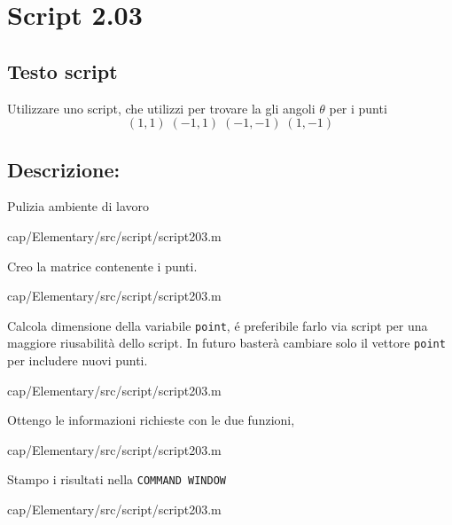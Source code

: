 \section{Script 2.03}\label{scr:script203}

\subsection{Testo script}
Utilizzare uno script, che utilizzi  
per trovare la  gli angoli $\theta$ per i punti  
$$(1,1)\;(-1,1)\;(-1,-1)\;(1,-1)$$

\subsection{Descrizione:}
Pulizia ambiente di lavoro

{cap/Elementary/src/script/script203.m}
\vspace{0.5em}

Creo la matrice contenente i punti.

{cap/Elementary/src/script/script203.m}
\vspace{1em}

Calcola dimensione della variabile \verb|point|, é preferibile farlo via script 
per una maggiore riusabilità dello script. In futuro basterà cambiare solo il 
vettore \verb|point| per includere nuovi punti.

{cap/Elementary/src/script/script203.m}
\vspace{1em}

Ottengo le informazioni richieste con le due funzioni, 

{cap/Elementary/src/script/script203.m}
\vspace{1em}

Stampo i risultati nella \verb|COMMAND WINDOW|

{cap/Elementary/src/script/script203.m}
\vspace{1em}

